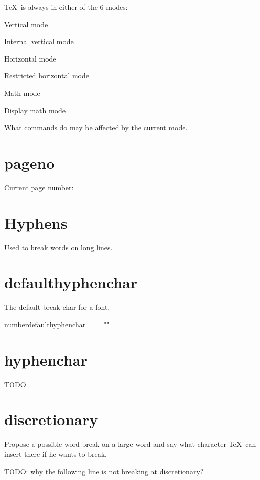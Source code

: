   \TeX\ is always in either of the 6 modes:

  \item{} Vertical mode
  \item{} Internal vertical mode
  \item{} Horizontal mode
  \item{} Restricted horizontal mode
  \item{} Math mode
  \item{} Display math mode

  What commands do may be affected by the current mode.

\section{pageno}

  Current page number: \number\pageno

\section{Hyphens}

  Used to break words on long lines.

  \section{defaulthyphenchar}

    The default break char for a font.

    \bs number\bs defaulthyphenchar = \number{} = "{\char{}}"

  \section{hyphenchar}

    TODO

  \section{discretionary}

    Propose a possible word break on a large word and say what character \TeX\ can insert there if he wants to break.

    TODO: why the following line is not breaking at discretionary?


